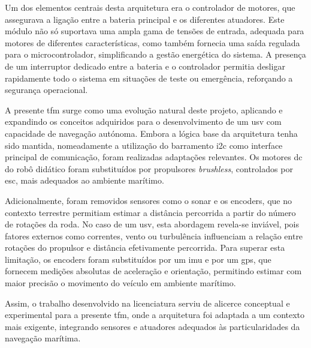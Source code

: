 Um dos elementos centrais desta arquitetura era o controlador de motores, que assegurava a ligação entre a bateria principal e os diferentes atuadores. Este módulo não só suportava uma ampla gama de tensões de entrada, adequada para motores de diferentes características, como também fornecia uma saída regulada para o microcontrolador, simplificando a gestão energética do sistema. A presença de um interruptor dedicado entre a bateria e o controlador permitia desligar rapidamente todo o sistema em situações de teste ou emergência, reforçando a segurança operacional.  

A presente \gls{tfm} surge como uma evolução natural deste projeto, aplicando e expandindo os conceitos adquiridos para o desenvolvimento de um \gls{usv} com capacidade de navegação autónoma. Embora a lógica base da arquitetura tenha sido mantida, nomeadamente a utilização do barramento \gls{i2c} como interface principal de comunicação, foram realizadas adaptações relevantes. Os motores \gls{dc} do robô didático foram substituídos por propulsores \emph{brushless}, controlados por \gls{esc}, mais adequados ao ambiente marítimo.  

Adicionalmente, foram removidos sensores como o sonar e os encoders, que no contexto terrestre permitiam estimar a distância percorrida a partir do número de rotações da roda. No caso de um \gls{usv}, esta abordagem revela-se inviável, pois fatores externos como correntes, vento ou turbulência influenciam a relação entre rotações do propulsor e distância efetivamente percorrida. Para superar esta limitação, os encoders foram substituídos por um \gls{imu} e por um \gls{gps}, que fornecem medições absolutas de aceleração e orientação, permitindo estimar com maior precisão o movimento do veículo em ambiente marítimo.  

Assim, o trabalho desenvolvido na licenciatura serviu de alicerce conceptual e experimental para a presente \gls{tfm}, onde a arquitetura foi adaptada a um contexto mais exigente, integrando sensores e atuadores adequados às particularidades da navegação marítima.
